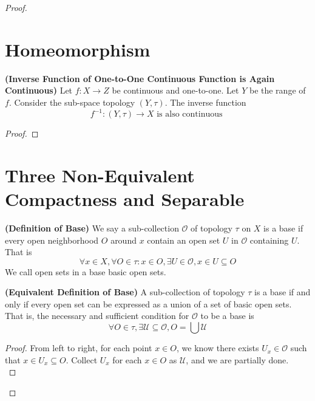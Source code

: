 \documentclass{report}
\begin{document}
\begin{proof}
\section{Homeomorphism}
\begin{theorem}
\label{2.5.1}
\textbf{(Inverse Function of One-to-One Continuous Function is Again Continuous)} Let $f:X\rightarrow Z$ be continuous and one-to-one. Let $Y$ be the range of  $f$. Consider the sub-space topology  $(Y,\tau)$. The inverse function 
\begin{equation*}
f^{-1}:(Y,\tau)\rightarrow X\text{ is also continuous }
\end{equation*}
\end{theorem}
\begin{proof}
\end{proof}

\section{Three Non-Equivalent Compactness and Separable}
\begin{definition}
\label{2.6.1}
\textbf{(Definition of Base)} We say a sub-collection $\mathcal{O}$ of topology $\tau$ on $X$ is a base if every open neighborhood $O$ around $x$ contain an open set $U$ in $\mathcal{O}$ containing $U$. That is
\begin{equation}
\forall x\in X, \forall O\in\tau:x\in O,\exists U\in \mathcal{O}, x\in U\subseteq O
\end{equation}
We call open sets in a base basic open sets.
\end{definition}
\begin{theorem}
\label{2.6.2}
\textbf{(Equivalent Definition of Base)} A sub-collection of topology $\tau$ is a base if and only if every open set can be expressed as a union of a set of basic open sets. That is, the necessary and sufficient condition for $\mathcal{O}$ to be a base is 
\begin{equation}
\forall O\in \tau, \exists \mathcal{U}\subseteq \mathcal{O}, O=\bigcup \mathcal{U}
\end{equation}
\end{theorem}
\begin{proof}
  From left to right, for each point $x\in O$, we know there exists $U_x\in \mathcal{O}$ such that $x\in U_x\subseteq O$. Collect $U_x$ for each $x\in O$ as $\mathcal{U}$, and we are partially done.\\


\end{proof}
\end{proof}
\end{document}
